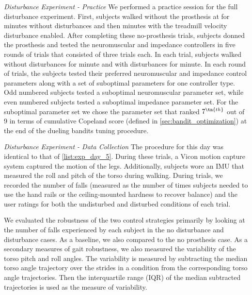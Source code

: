 \begin{days}
    \item\label{list:exp_day_5} \emph{Disturbance Experiment - Practice} We
    performed a practice session for the full disturbance experiment. First,
    subjects walked without the prosthesis at  for
    \unit[2]{minutes} without disturbances and then \unit[2]{minutes} with the
    treadmill velocity disturbance enabled. After completing these no-prosthesis
    trials, subjects donned the prosthesis and tested the neuromuscular and
    impedance controllers in five rounds of trials that consisted of three
    trials each. In each trial, subjects walked without disturbances for
    \unit[1]{minute} and with disturbances for \unit[1]{minute}. In each round
    of trials, the subjects tested their preferred neuromuscular and impedance
    control parameters along with a set of suboptimal parameters for one
    controller type. Odd numbered subjects tested a suboptimal neuromuscular
    parameter set, while even numbered subjects tested a suboptimal impedance
    parameter set. For the suboptimal parameter set we chose the parameter set
    that ranked $7^\tn{th}$ out of 9 in terms of cumulative Copeland score
    (defined in \cref{sec:bandit_optimization}) at the end of the dueling
    bandits tuning procedure.

    \item\label{list:exp_day_6} \emph{Disturbance Experiment - Data Collection}
    The procedure for this day was identical to that of \cref{list:exp_day_5}.
    During these trials, a Vicon motion capture system captured the motion of
    the legs. Additionally, subjects wore an IMU that measured the roll and
    pitch of the torso during walking. During trials, we recorded the number of
    falls (measured as the number of times subjects needed to use the hand rails
    or the ceiling-mounted hardness to recover balance) and the user ratings for
    both the undisturbed and disturbed conditions of each trial. 
\end{days}

We evaluated the robustness of the two control strategies primarily by looking
at the number of falls experienced by each subject in the no disturbance and
disturbance cases. As a baseline, we also compared to the no prosthesis case. As
a secondary measures of gait robustness, we also measured the variability of the
torso pitch and roll angles. The variability is measured by subtracting the
median torso angle trajectory over the strides in a condition from the
corresponding torso angle trajectories. Then the interquartile range (IQR) of
the median subtracted trajectories is used as the measure of variability.
